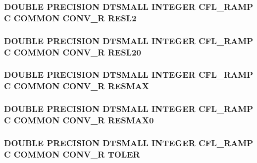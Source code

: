 \hypertarget{conv_8com_a4c87ffcd683e561c462fb951f8fd3dba}{
\subsubsection[{R\-E\-S\-L2}]{\setlength{\rightskip}{0pt plus 5cm}D\-O\-U\-B\-L\-E P\-R\-E\-C\-I\-S\-I\-O\-N D\-T\-S\-M\-A\-L\-L I\-N\-T\-E\-G\-E\-R C\-F\-L\-\_\-\-R\-A\-M\-P C C\-O\-M\-M\-O\-N C\-O\-N\-V\-\_\-\-R R\-E\-S\-L2}}\label{conv_8com_a4c87ffcd683e561c462fb951f8fd3dba}
\hypertarget{conv_8com_a7c9ea192bf2277352d3bf39c771cfdba}{
\subsubsection[{R\-E\-S\-L20}]{\setlength{\rightskip}{0pt plus 5cm}D\-O\-U\-B\-L\-E P\-R\-E\-C\-I\-S\-I\-O\-N D\-T\-S\-M\-A\-L\-L I\-N\-T\-E\-G\-E\-R C\-F\-L\-\_\-\-R\-A\-M\-P C C\-O\-M\-M\-O\-N C\-O\-N\-V\-\_\-\-R R\-E\-S\-L20}}\label{conv_8com_a7c9ea192bf2277352d3bf39c771cfdba}
\hypertarget{conv_8com_a5a9ca2e120b65c5a46caf09d3a3aff16}{
\subsubsection[{R\-E\-S\-M\-A\-X}]{\setlength{\rightskip}{0pt plus 5cm}D\-O\-U\-B\-L\-E P\-R\-E\-C\-I\-S\-I\-O\-N D\-T\-S\-M\-A\-L\-L I\-N\-T\-E\-G\-E\-R C\-F\-L\-\_\-\-R\-A\-M\-P C C\-O\-M\-M\-O\-N C\-O\-N\-V\-\_\-\-R R\-E\-S\-M\-A\-X}}\label{conv_8com_a5a9ca2e120b65c5a46caf09d3a3aff16}
\hypertarget{conv_8com_a6783bad88b4fdda9cf12e1788ad0a190}{
\subsubsection[{R\-E\-S\-M\-A\-X0}]{\setlength{\rightskip}{0pt plus 5cm}D\-O\-U\-B\-L\-E P\-R\-E\-C\-I\-S\-I\-O\-N D\-T\-S\-M\-A\-L\-L I\-N\-T\-E\-G\-E\-R C\-F\-L\-\_\-\-R\-A\-M\-P C C\-O\-M\-M\-O\-N C\-O\-N\-V\-\_\-\-R R\-E\-S\-M\-A\-X0}}\label{conv_8com_a6783bad88b4fdda9cf12e1788ad0a190}
\hypertarget{conv_8com_a695d875d45bd834620ef52158325ca2a}{
\subsubsection[{T\-O\-L\-E\-R}]{\setlength{\rightskip}{0pt plus 5cm}D\-O\-U\-B\-L\-E P\-R\-E\-C\-I\-S\-I\-O\-N D\-T\-S\-M\-A\-L\-L I\-N\-T\-E\-G\-E\-R C\-F\-L\-\_\-\-R\-A\-M\-P C C\-O\-M\-M\-O\-N C\-O\-N\-V\-\_\-\-R T\-O\-L\-E\-R}}\label{conv_8com_a695d875d45bd834620ef52158325ca2a}
